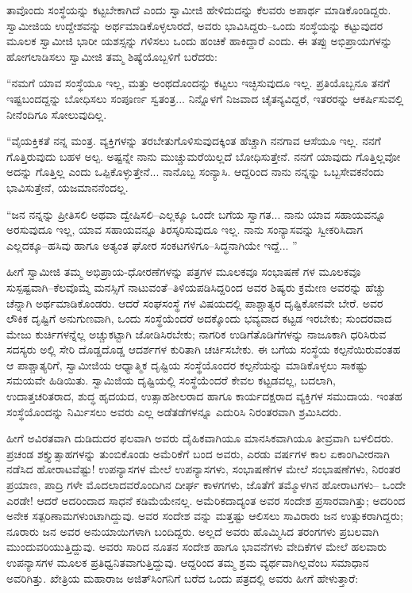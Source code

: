 ತಾವೊಂದು ಸಂಸ್ಥೆಯನ್ನು ಕಟ್ಟಬೇಕಾಗಿದೆ ಎಂದು ಸ್ವಾಮೀಜಿ ಹೇಳಿದುದನ್ನು ಕೆಲವರು ಅಪಾರ್ಥ ಮಾಡಿಕೊಂಡಿದ್ದರು. ಸ್ವಾಮೀಜಿಯ ಉದ್ದೇಶವನ್ನು ಅರ್ಥಮಾಡಿಕೊಳ್ಳಲಾರದೆ, ಅವರು ಭಾವಿಸಿದ್ದರು–ಒಂದು ಸಂಸ್ಥೆಯನ್ನು ಕಟ್ಟುವುದರ ಮೂಲಕ ಸ್ವಾಮೀಜಿ ಭಾರೀ ಯಶಸ್ಸನ್ನು ಗಳಿಸಲು ಒಂದು ಹಂಚಿಕೆ ಹಾಕಿದ್ದಾರೆ ಎಂದು. ಈ ತಪ್ಪು ಅಭಿಪ್ರಾಯಗಳನ್ನು ಹೋಗಲಾಡಿಸಲು ಸ್ವಾಮೀಜಿ ತಮ್ಮ ಶಿಷ್ಯೆಯೊಬ್ಬಳಿಗೆ ಬರೆದರು:

“ನಮಗೆ ಯಾವ ಸಂಸ್ಥೆಯೂ ಇಲ್ಲ, ಮತ್ತು ಅಂಥದೊಂದನ್ನು ಕಟ್ಟಲು ಇಚ್ಛಿಸುವುದೂ ಇಲ್ಲ. ಪ್ರತಿಯೊಬ್ಬನೂ ತನಗೆ ಇಷ್ಟಬಂದದ್ದನ್ನು ಬೋಧಿಸಲು ಸಂಪೂರ್ಣ ಸ್ವತಂತ್ರ... ನಿನ್ನೊಳಗೆ ನಿಜವಾದ ಚೈತನ್ಯವಿದ್ದರೆ, ಇತರರನ್ನು ಆಕರ್ಷಿಸುವಲ್ಲಿ ನೀನೆಂದಿಗೂ ಸೋಲುವುದಿಲ್ಲ.

“ವೈಯಕ್ತಿಕತೆ ನನ್ನ ಮಂತ್ರ. ವ್ಯಕ್ತಿಗಳನ್ನು ತರಬೇತುಗೊಳಿಸುವುದಕ್ಕಿಂತ ಹೆಚ್ಚಾಗಿ ನನಗಾವ ಆಸೆಯೂ ಇಲ್ಲ. ನನಗೆ ಗೊತ್ತಿರುವುದು ಬಹಳ ಅಲ್ಪ. ಅಷ್ಟನ್ನೇ ನಾನು ಮುಚ್ಚುಮರೆಯಿಲ್ಲದೆ ಬೋಧಿಸುತ್ತೇನೆ. ನನಗೆ ಯಾವುದು ಗೊತ್ತಿಲ್ಲವೋ ಅದನ್ನು ಗೊತ್ತಿಲ್ಲ ಎಂದು ಒಪ್ಪಿಕೊಳ್ಳುತ್ತೇನೆ... ನಾನೊಬ್ಬ ಸಂನ್ಯಾಸಿ. ಆದ್ದರಿಂದ ನಾನು ನನ್ನನ್ನು ಒಬ್ಬಸೇವಕನೆಂದು ಭಾವಿಸುತ್ತೇನೆ, ಯಜಮಾನನೆಂದಲ್ಲ.

“ಜನ ನನ್ನನ್ನು ಪ್ರೀತಿಸಲಿ ಅಥವಾ ದ್ವೇಷಿಸಲಿ–ಎಲ್ಲಕ್ಕೂ ಒಂದೇ ಬಗೆಯ ಸ್ವಾಗತ... ನಾನು ಯಾವ ಸಹಾಯವನ್ನೂ ಅರಸುವುದೂ ಇಲ್ಲ, ಯಾವ ಸಹಾಯವನ್ನೂ ತಿರಸ್ಕರಿಸುವುದೂ ಇಲ್ಲ. ನಾನು ಸಂನ್ಯಾಸವನ್ನು ಸ್ವೀಕರಿಸಿದಾಗ ಎಲ್ಲದಕ್ಕೂ–ಹಸಿವು ಹಾಗೂ ಅತ್ಯಂತ ಘೋರ ಸಂಕಟಗಳಿಗೂ–ಸಿದ್ಧನಾಗಿಯೇ ಇದ್ದೆ... ”

ಹೀಗೆ ಸ್ವಾಮೀಜಿ ತಮ್ಮ ಅಭಿಪ್ರಾಯ-ಧೋರಣೆಗಳನ್ನು ಪತ್ರಗಳ ಮೂಲಕವೂ ಸಂಭಾಷಣೆ ಗಳ ಮೂಲಕವೂ ಸುಸ್ಪಷ್ಟವಾಗಿ–ಕೆಲವೊಮ್ಮೆ ಮನಸ್ಸಿಗೆ ನಾಟುವಂತೆ–ತಿಳಿಯಪಡಿಸಿದ್ದರಿಂದ ಅವರ ಶಿಷ್ಯರು ಕ್ರಮೇಣ ಅವರನ್ನು ಹೆಚ್ಚು ಚೆನ್ನಾಗಿ ಅರ್ಥಮಾಡಿಕೊಂಡರು. ಆದರೆ ಸಂಘಸಂಸ್ಥೆ ಗಳ ವಿಷಯದಲ್ಲಿ ಪಾಶ್ಚಾತ್ಯರ ದೃಷ್ಟಿಕೋನವೇ ಬೇರೆ. ಅವರ ಲೌಕಿಕ ದೃಷ್ಟಿಗೆ ಅನುಗುಣವಾಗಿ, ಒಂದು ಸಂಸ್ಥೆಯೆಂದರೆ ಅದಕ್ಕೊಂದು ಭವ್ಯವಾದ ಕಟ್ಟಡ ಇರಬೇಕು; ಸುಂದರವಾದ ಮೇಜು ಕುರ್ಚಿಗಳನ್ನೆಲ್ಲ ಅಚ್ಚುಕಟ್ಟಾಗಿ ಜೋಡಿಸಿರಬೇಕು; ನಾಗರಿಕ ಉಡಿಗೆತೊಡಿಗೆಗಳನ್ನು ನಾಜೂಕಾಗಿ ಧರಿಸಿರುವ ಸದಸ್ಯರು ಅಲ್ಲಿ ಸೇರಿ ದೊಡ್ಡದೊಡ್ಡ ಆದರ್ಶಗಳ ಕುರಿತಾಗಿ ಚರ್ಚಿಸಬೇಕು. ಈ ಬಗೆಯ ಸಂಸ್ಥೆಯ ಕಲ್ಪನೆಯಿರುವಂತಹ ಆ ಪಾಶ್ಚಾತ್ಯರಿಗೆ, ಸ್ವಾಮೀಜಿಯ ಆಧ್ಯಾತ್ಮಿಕ ದೃಷ್ಟಿಯ ಸಂಸ್ಥೆಯೊಂದರ ಕಲ್ಪನೆಯನ್ನು ಮಾಡಿಕೊಳ್ಳಲು ಸಾಕಷ್ಟು ಸಮಯವೇ ಹಿಡಿಯಿತು. ಸ್ವಾಮಿಜಿಯ ದೃಷ್ಟಿಯಲ್ಲಿ ಸಂಸ್ಥೆಯೆಂದರೆ ಕೇವಲ ಕಟ್ಟಡವಲ್ಲ, ಬದಲಾಗಿ, ಉದಾತ್ತಚರಿತರಾದ, ಶುದ್ಧ ಹೃದಯದ, ಉತ್ಸಾಹಶೀಲರಾದ ಹಾಗೂ ಕಾರ್ಯದಕ್ಷರಾದ ವ್ಯಕ್ತಿಗಳ ಸಮುದಾಯ. ಇಂತಹ ಸಂಸ್ಥೆಯೊಂದನ್ನು ನಿರ್ಮಿಸಲು ಅವರು ಎಲ್ಲ ಅಡೆತಡೆಗಳನ್ನೂ ಎದುರಿಸಿ ನಿರಂತರವಾಗಿ ಶ್ರಮಿಸಿದರು.

ಹೀಗೆ ಅವಿರತವಾಗಿ ದುಡಿದುದರ ಫಲವಾಗಿ ಅವರು ದೈಹಿಕವಾಗಿಯೂ ಮಾನಸಿಕವಾಗಿಯೂ ತೀವ್ರವಾಗಿ ಬಳಲಿದರು. ಪ್ರಚಂಡ ಶಕ್ತ್ಯುತ್ಸಾಹಗಳನ್ನು ತುಂಬಿಕೊಂಡು ಅಮೆರಿಕೆಗೆ ಬಂದ ಅವರು, ಎರಡು ವರ್ಷಗಳ ಕಾಲ ಏಕಾಂಗಿವೀರನಾಗಿ ನಡೆಸಿದ ಹೋರಾಟವೆಷ್ಟು! ಉಪನ್ಯಾಸಗಳ ಮೇಲೆ ಉಪನ್ಯಾಸಗಳು, ಸಂಭಾಷಣೆಗಳ ಮೇಲೆ ಸಂಭಾಷಣೆಗಳು, ನಿರಂತರ ಪ್ರಯಾಣ, ಪಾದ್ರಿ ಗಳೇ ಮೊದಲಾದವರೊಂದಿಗಿನ ದೀರ್ಘ ಕಾಳಗಗಳು, ಜೊತೆಗೆ ತಮ್ಮೊಳಗಿನ ಹೋರಾಟಗಳು– ಒಂದೇ ಎರಡೇ! ಆದರೆ ಅದರಿಂದಾದ ಸಾಧನೆ ಕಡಿಮೆಯೇನಲ್ಲ. ಅಮೆರಿಕದಾದ್ಯಂತ ಅವರ ಸಂದೇಶ ಪ್ರಸಾರವಾಗಿತ್ತು; ಅದರಿಂದ ಅನೇಕ ಸತ್ಪರಿಣಾಮಗಳುಂಟಾಗಿದ್ದುವು. ಅವರ ಸಂದೇಶ ವನ್ನು ಮತ್ತಷ್ಟು ಆಲಿಸಲು ಸಾವಿರಾರು ಜನ ಉತ್ಸುಕರಾಗಿದ್ದರು; ನೂರಾರು ಜನ ಅವರ ಅನುಯಾಯಿಗಳಾಗಿ ಬಂದಿದ್ದರು. ಅಲ್ಲದೆ ಅವರು ಹೊಮ್ಮಿಸಿದ ತರಂಗಗಳು ಪ್ರಬಲವಾಗಿ ಮುಂದುವರಿಯುತ್ತಿದ್ದುವು. ಅವರು ಸಾರಿದ ನೂತನ ಸಂದೇಶ ಹಾಗೂ ಭಾವನೆಗಳು ವೇದಿಕೆಗಳ ಮೇಲೆ ಹಲವಾರು ಉಪನ್ಯಾಸಗಳ ಮೂಲಕ ಪ್ರತಿಧ್ವನಿತವಾಗುತ್ತಿದ್ದುವು. ಆದ್ದರಿಂದ ತಮ್ಮ ಶ್ರಮ ವ್ಯರ್ಥವಾಗಿಲ್ಲವೆಂಬ ಸಮಾಧಾನ ಅವರಿಗಿತ್ತು. ಖೇತ್ರಿಯ ಮಹಾರಾಜ ಅಜಿತ್​ಸಿಂಗನಿಗೆ ಬರೆದ ಒಂದು ಪತ್ರದಲ್ಲಿ ಅವರು ಹೀಗೆ ಹೇಳುತ್ತಾರೆ:

